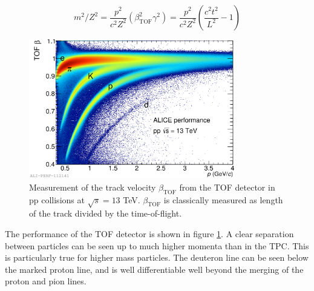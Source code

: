\begin{equation}\label{eq:TOFm2}
    m^2/Z^2 = \frac{p^2}{c^2 Z^2}\left(\beta_{\mathrm{TOF}}^2\gamma^2 \right) = \frac{p^2}{c^2 Z^2} \left( \frac{c^2t^2}{L^2} -1\right)
\end{equation}

\begin{figure}
    \centering
    \includegraphics[width=0.8\textwidth]{figures/2016-Sep-08-beta.pdf}
    \caption{Measurement of the track velocity $\beta_{\mathrm{TOF}}$ from the TOF detector in pp collisions at $\sqrt{s}=13$ TeV. $\beta_{\mathrm{TOF}}$ is classically measured as length of the track divided by the time-of-flight.}
    \label{fig:TOF_performance}
\end{figure}

The performance of the TOF detector is shown in figure \ref{fig:TOF_performance}. A clear separation between particles can be seen up to much higher momenta than in the TPC. This is particularly true for higher mass particles. The deuteron line can be seen below the marked proton line, and is well differentiable well beyond the merging of the proton and pion lines. 



